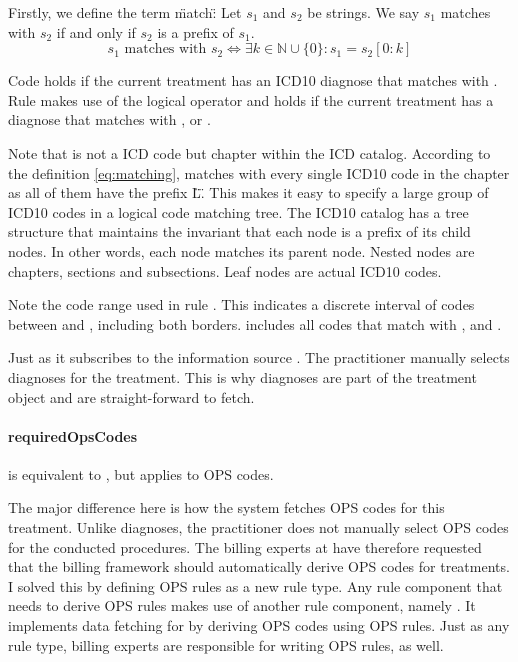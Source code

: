 Firstly, we define the term \"match\":
Let \( s_1 \) and \( s_2 \) be strings.
We say \( s_1 \) matches with \( s_2 \) if and only if \( s_2 \) is a prefix of \( s_1 \).
\begin{equation}
    \label{eq:matching}
    s_1 \text{ matches with } s_2 \iff \exists k \in \mathbb{N} \cup \{0\} : s_1 = s_2[0:k]
\end{equation}

Code  holds if the current treatment has an ICD10 diagnose that matches with .
Rule  makes use of the logical  operator and holds if the current treatment has a diagnose that matches with ,  or .

Note that  is not a ICD code but chapter within the ICD catalog.
According to the definition \ref{eq:matching},  matches with every single ICD10 code in the  chapter as all of them have the prefix \"L\".
This makes it easy to specify a large group of ICD10 codes in a logical code matching tree.
The ICD10 catalog has a tree structure that maintains the invariant that each node is a prefix of its child nodes.
In other words, each node matches its parent node.
Nested nodes are chapters, sections and subsections.
Leaf nodes are actual ICD10 codes.

Note the code range  used in rule .
This indicates a discrete interval of codes between  and , including both borders.
 includes all codes that match with ,  and .

Just as  it subscribes to the information source .
The practitioner manually selects diagnoses for the treatment.
This is why diagnoses are part of the treatment object and are straight-forward to fetch.

\paragraph{requiredOpsCodes}

 is equivalent to , but applies to OPS codes.

The major difference here is how the system fetches OPS codes for this treatment.
Unlike diagnoses, the practitioner does not manually select OPS codes for the conducted procedures.
The billing experts at \AV have therefore requested that the billing framework should automatically derive OPS codes for treatments.
I solved this by defining OPS rules as a new rule type.
Any rule component that needs to derive OPS rules makes use of another rule component, namely .
It implements data fetching for  by deriving OPS codes using OPS rules.
Just as any rule type, billing experts are responsible for writing OPS rules, as well.

